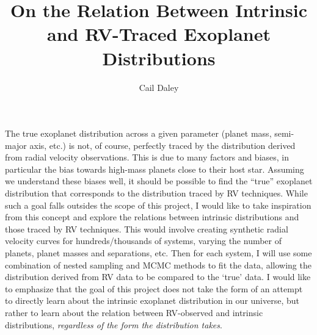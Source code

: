 \documentclass[12 pt, letterpaper]{article}
\begin{document}
\title{On the Relation Between Intrinsic and RV-Traced Exoplanet Distributions}
\author{Cail Daley}
\maketitle
\abstract

The true exoplanet distribution across a given parameter (planet mass, semi-major axis, etc.)  is not, of course, perfectly traced by the distribution derived from radial velocity observations. 
This is due to many factors and biases, in particular the bias towards high-mass planets close to their host star. 
Assuming we understand these biases well, it should be possible to find the “true” exoplanet distribution that corresponds to the distribution traced by RV techniques. 
While such a goal falls outsides the scope of this project, I would like to take inspiration from this concept and explore the relations between intrinsic distributions and those traced by RV techniques.
This would involve creating synthetic radial velocity curves for hundreds/thousands of systems, varying the number of planets, planet masses and separations, etc. Then for each system, I will use some combination of nested sampling and MCMC methods to fit the data, allowing the distribution derived from RV data to be compared to the `true' data. 
I would like to emphasize that the goal of this project does not take the form of an attempt to directly learn about the intrinsic exoplanet distribution in our universe, but rather to learn about the relation between RV-observed and intrinsic distributions, \textit{regardless of the form the distribution takes}.
\end{document}
